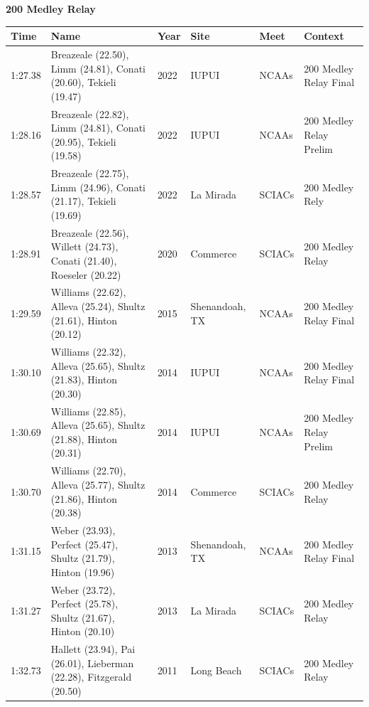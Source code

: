 \noindent\begin{minipage}[t]{0.98\textwidth}
\centering
\textbf{\textcolor{teamprimary}{200 Medley Relay}}\par
\vspace{0.5em}
\centering
\small
\renewcommand{\arraystretch}{1.0}
\setlength{\tabcolsep}{4pt}
\begin{tabular}{@{}p{2.0cm}p{3.2cm}p{1.2cm}p{2.0cm}p{2.0cm}p{2.5cm}@{}}
\toprule
\textbf{Time} & \textbf{Name} & \textbf{Year} & \textbf{Site} & \textbf{Meet} & \textbf{Context} \\
\midrule
1:27.38 & Breazeale (22.50), Limm (24.81), Conati (20.60), Tekieli (19.47) & 2022 & IUPUI & NCAAs & 200 Medley Relay Final \\
1:28.16 & Breazeale (22.82), Limm (24.81), Conati (20.95), Tekieli (19.58) & 2022 & IUPUI & NCAAs & 200 Medley Relay Prelim \\
1:28.57 & Breazeale (22.75), Limm (24.96), Conati (21.17), Tekieli (19.69) & 2022 & La Mirada & SCIACs & 200 Medley Rely \\
1:28.91 & Breazeale (22.56), Willett (24.73), Conati (21.40), Roeseler (20.22) & 2020 & Commerce & SCIACs & 200 Medley Relay \\
1:29.59 & Williams (22.62), Alleva (25.24), Shultz (21.61), Hinton (20.12) & 2015 & Shenandoah, TX & NCAAs & 200 Medley Relay Final \\
1:30.10 & Williams (22.32), Alleva (25.65), Shultz (21.83), Hinton (20.30) & 2014 & IUPUI & NCAAs & 200 Medley Relay Final \\
1:30.69 & Williams (22.85), Alleva (25.65), Shultz (21.88), Hinton (20.31) & 2014 & IUPUI & NCAAs & 200 Medley Relay Prelim \\
1:30.70 & Williams (22.70), Alleva (25.77), Shultz (21.86), Hinton (20.38) & 2014 & Commerce & SCIACs & 200 Medley Relay \\
1:31.15 & Weber (23.93), Perfect (25.47), Shultz (21.79), Hinton (19.96) & 2013 & Shenandoah, TX & NCAAs & 200 Medley Relay Final \\
1:31.27 & Weber (23.72), Perfect (25.78), Shultz (21.67), Hinton (20.10) & 2013 & La Mirada & SCIACs & 200 Medley Relay \\
1:32.73 & Hallett (23.94), Pai (26.01), Lieberman (22.28), Fitzgerald (20.50) & 2011 & Long Beach & SCIACs & 200 Medley Relay \\
\bottomrule
\end{tabular}
\end{minipage}
\vspace{1.2em}
